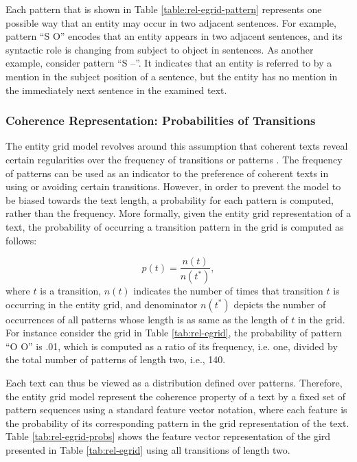 Each pattern that is shown in Table \ref{table:rel-egrid-pattern} represents one possible way that an entity may occur in two adjacent sentences. 
For example, pattern ``S O'' encodes that an entity appears in two adjacent sentences, and its syntactic role is changing from subject to object in sentences. 
As another example, consider pattern ``S --''. 
It indicates that an entity is referred to by a mention in the subject position of a sentence, but the entity has no mention in the immediately next sentence in the examined text.  

\subsubsection{Coherence Representation: Probabilities of Transitions}
%
The entity grid model revolves around this assumption that coherent texts reveal certain regularities over the frequency of transitions or patterns \cite{barzilay05a,barzilay08}.    
The frequency of patterns can be used as an indicator to the preference of coherent texts in using or avoiding certain transitions. 
However, in order to prevent the model to be biased towards the text length, a probability for each pattern is computed, rather than the frequency. 	 
More formally, given the entity grid representation of a text, the probability of occurring a transition pattern in the grid is computed as follows:

\begin{equation}
p(t) = \frac{n(t)}{n(t^*)},
\end{equation}
where $t$ is a transition, $n(t)$ indicates the number of times that transition $t$ is occurring in the entity grid, and denominator $n(t^*)$ depicts the number of occurrences of all patterns whose length is as same as the length of $t$ in the grid. 
For instance consider the grid in Table \ref{tab:rel-egrid}, the probability of pattern ``O O'' is .01, which is computed as a ratio of its frequency, i.e. one, divided by the total number of patterns of length two, i.e., 140. 


Each text can thus be viewed as a distribution defined over patterns. 
Therefore, the entity grid model represent the coherence property of a text by a fixed set of pattern sequences using a standard feature vector notation, where each feature is the probability of its corresponding pattern in the grid representation of the text.  
Table \ref{tab:rel-egrid-probs} shows the feature vector representation of the gird presented in Table \ref{tab:rel-egrid} using all transitions of length two. 

